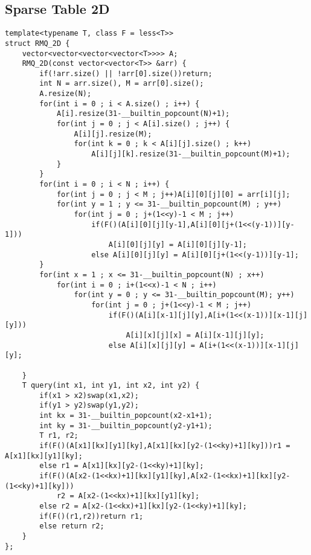 \documentclass[landscape, 8pt, a4paper, oneside]{extarticle}
\begin{document}
\begin{multicols}{3}
\subsection{Sparse Table 2D}
\begin{verbatim}
template<typename T, class F = less<T>>
struct RMQ_2D {
    vector<vector<vector<vector<T>>>> A;
    RMQ_2D(const vector<vector<T>> &arr) {
        if(!arr.size() || !arr[0].size())return;
        int N = arr.size(), M = arr[0].size();
        A.resize(N);
        for(int i = 0 ; i < A.size() ; i++) {
            A[i].resize(31-__builtin_popcount(N)+1);
            for(int j = 0 ; j < A[i].size() ; j++) {
                A[i][j].resize(M);
                for(int k = 0 ; k < A[i][j].size() ; k++)
                    A[i][j][k].resize(31-__builtin_popcount(M)+1);
            }
        }
        for(int i = 0 ; i < N ; i++) {
            for(int j = 0 ; j < M ; j++)A[i][0][j][0] = arr[i][j];
            for(int y = 1 ; y <= 31-__builtin_popcount(M) ; y++)
                for(int j = 0 ; j+(1<<y)-1 < M ; j++)
                    if(F()(A[i][0][j][y-1],A[i][0][j+(1<<(y-1))][y-1]))
                        A[i][0][j][y] = A[i][0][j][y-1];
                    else A[i][0][j][y] = A[i][0][j+(1<<(y-1))][y-1];
        }
        for(int x = 1 ; x <= 31-__builtin_popcount(N) ; x++)
            for(int i = 0 ; i+(1<<x)-1 < N ; i++)
                for(int y = 0 ; y <= 31-__builtin_popcount(M); y++)
                    for(int j = 0 ; j+(1<<y)-1 < M ; j++)
                        if(F()(A[i][x-1][j][y],A[i+(1<<(x-1))][x-1][j][y]))
                            A[i][x][j][x] = A[i][x-1][j][y];
                        else A[i][x][j][y] = A[i+(1<<(x-1))][x-1][j][y];

    }
    T query(int x1, int y1, int x2, int y2) {
        if(x1 > x2)swap(x1,x2);
        if(y1 > y2)swap(y1,y2);
        int kx = 31-__builtin_popcount(x2-x1+1);
        int ky = 31-__builtin_popcount(y2-y1+1);
        T r1, r2;
        if(F()(A[x1][kx][y1][ky],A[x1][kx][y2-(1<<ky)+1][ky]))r1 = A[x1][kx][y1][ky];
        else r1 = A[x1][kx][y2-(1<<ky)+1][ky];
        if(F()(A[x2-(1<<kx)+1][kx][y1][ky],A[x2-(1<<kx)+1][kx][y2-(1<<ky)+1][ky]))
            r2 = A[x2-(1<<kx)+1][kx][y1][ky];
        else r2 = A[x2-(1<<kx)+1][kx][y2-(1<<ky)+1][ky];
        if(F()(r1,r2))return r1;
        else return r2;
    }
};
\end{verbatim}

\end{multicols}
\end{document}
